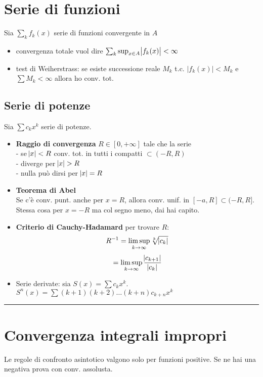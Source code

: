 \documentclass[a4paper,portrait,columns=3,5pt]{cheatsheet}
\begin{document}
\section{Serie di funzioni}
Sia $\sum_k f_k(x)$ serie di funzioni convergente in $A$
\begin{itemize}
    \item convergenza totale vuol dire $\sum_k \sup_{x \in A} \abs{f_k(x)} < \infty$
    \item test di Weiherstrass: se esiste successione reale $M_k$ t.c. $\left|f_k(x)\right| < M_k$ e $\sum M_k < \infty$ allora ho conv. tot.
\end{itemize}
\subsection{Serie di potenze}
Sia $\sum c_k x^k$ serie di potenze.
\begin{itemize}
    \item \textbf{Raggio di convergenza} $R \in [0, +\infty]$ tale che la serie \\- se $\abs{x} < R$ conv. tot. in tutti i compatti $\subset (-R, R)$\\- diverge per $\abs{x} > R$\\ - nulla può dirsi per $\abs{x} = R$
    \item \textbf{Teorema di Abel} \\Se c'è conv. punt. anche per $x = R$, allora conv. unif. in $[-a, R] \subset (-R, R]$. Stessa cosa per $x=-R$ ma col segno meno, dai hai capito.
    \item \textbf{Criterio di Cauchy-Hadamard} per trovare $R$: \\ $$R^{-1} = \limsup_{k\rightarrow \infty} \sqrt[k]{\abs{c_k}} $$ $$ = \limsup_{k \rightarrow \infty} \frac{\abs{c_{k+1}}}{\abs{c_k}}$$
    \item Serie derivate: sia $S(x) = \sum c_k x^k$. $S^n(x) = \sum (k+1)(k+2)\dots (k+n) c_{k+n} x^k$
\end{itemize}
\hrule

\section{Convergenza integrali impropri}
Le regole di confronto asintotico valgono solo per funzioni positive. Se ne hai una negativa prova con conv. assolusta.
\end{document}
